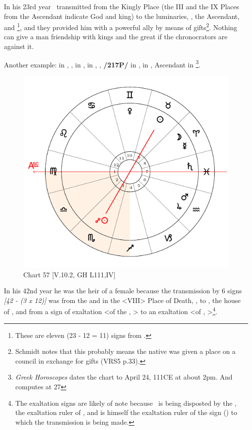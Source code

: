 In his 23rd year \Jupiter\, transmitted from the Kingly Place (the III and the IX Places from the Ascendant indicate God and king) to the luminaries, \Venus, the Ascendant, and \Mercury\footnote{These are eleven (23 - 12 = 11) signs from \Jupiter.}, and they provided him with a powerful ally by means of gifts\footnote{Schmidt notes that this probably means the native was given a place on a council in exchange for gifts (VRS5 p.33).}. Nothing can give a man friendship with kings and the great if the chronocrators are against it.

Another example: \Sun\xspace in \Taurus, \Moon, \Mercury\xspace in \Aries, \Saturn\xspace in \Pisces, \Jupiter, \textbf{/217P/} \Mars\xspace in \Aquarius, \Venus\xspace in \Gemini, Ascendant in \Virgo\footnote{\textit{Greek Horoscopes} dates the chart to April 24, 111CE at about 2pm. And computes \Jupiter\xspace at 27 \Capricorn}. 

\begin{figure}
\centering
\vspace{-20pt}
\includegraphics[width=.68\textwidth]{charts/5_10_02}
\caption{Chart 57 [V.10.2, GH L111,IV]}
\label{fig:chart57}
\end{figure}

In his 42nd year he was the heir of a female because the transmission by 6 signs \textsl{[42 - (3 x 12)]} was from the \Moon\xspace and \Mercury\xspace in the <VIII> Place of Death, \Aries, to \Virgo\xspace <the Ascendant>, the house of \Mercury, and from a sign of exaltation <of the \Sun, \Aries> to an exaltation <of \Mercury, \Virgo>\footnote{The exaltation signs are likely of note because \Mercury\, is being disposted by the \Sun, the exaltation ruler of \Aries, and is himself the exaltation ruler of the sign (\Virgo) to which the transmission is being made.}. 

